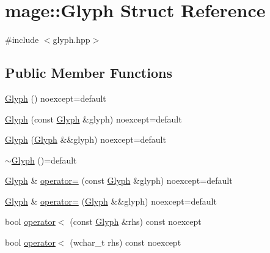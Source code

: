 \hypertarget{structmage_1_1_glyph}{}\section{mage\+:\+:Glyph Struct Reference}
\label{structmage_1_1_glyph}


{\ttfamily \#include $<$glyph.\+hpp$>$}

\subsection*{Public Member Functions}
\begin{DoxyCompactItemize}
\item 
\hyperlink{structmage_1_1_glyph_aae91987833c1a89f6ce416d22544bb4b}{Glyph} () noexcept=default
\item 
\hyperlink{structmage_1_1_glyph_a6915f88bb426261e67f243629509f9a9}{Glyph} (const \hyperlink{structmage_1_1_glyph}{Glyph} \&glyph) noexcept=default
\item 
\hyperlink{structmage_1_1_glyph_a823494adc2f56bee49c3f9e498638f60}{Glyph} (\hyperlink{structmage_1_1_glyph}{Glyph} \&\&glyph) noexcept=default
\item 
\hyperlink{structmage_1_1_glyph_aa8e903334e77cc2930149923461d06ab}{$\sim$\+Glyph} ()=default
\item 
\hyperlink{structmage_1_1_glyph}{Glyph} \& \hyperlink{structmage_1_1_glyph_a4cc57bb9e8ba26d625b75e6557415f8d}{operator=} (const \hyperlink{structmage_1_1_glyph}{Glyph} \&glyph) noexcept=default
\item 
\hyperlink{structmage_1_1_glyph}{Glyph} \& \hyperlink{structmage_1_1_glyph_a7562e4fbcafb0633ec2c6db5b5160670}{operator=} (\hyperlink{structmage_1_1_glyph}{Glyph} \&\&glyph) noexcept=default
\item 
bool \hyperlink{structmage_1_1_glyph_a7bb41307f74973e4bc547193dedc8dcc}{operator$<$} (const \hyperlink{structmage_1_1_glyph}{Glyph} \&rhs) const noexcept
\item 
bool \hyperlink{structmage_1_1_glyph_ad8e9835022217afef429f38891bba80e}{operator$<$} (wchar\+\_\+t rhs) const noexcept
\end{DoxyCompactItemize}
